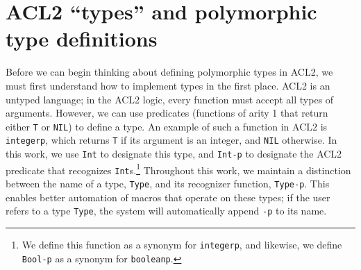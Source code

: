 \documentclass[]{eptcs}
\begin{document}
\section{ACL2 ``types'' and polymorphic type definitions}
Before we can begin thinking about defining polymorphic types in ACL2, we must first understand how to implement types in the first place. ACL2 is an untyped language; in the ACL2 logic, every function must accept all types of arguments. However, we can use predicates (functions of arity 1 that return either \verb|T| or \verb|NIL|) to define a type. An example of such a function in ACL2 is \verb|integerp|, which returns \verb|T| if its argument is an integer, and \verb|NIL| otherwise. In this work, we use \verb|Int| to designate this type, and \verb|Int-p| to designate the ACL2 predicate that recognizes \verb|Int|s.\footnote{We define this function as a synonym for \texttt{integerp}, and likewise, we define \texttt{Bool-p} as a synonym for \texttt{booleanp}.} Throughout this work, we maintain a distinction between the name of a type, \verb|Type|, and its recognizer function, \verb|Type-p|. This enables better automation of macros that operate on these types; if the user refers to a type \verb|Type|, the system will automatically append \verb|-p| to its name.
\end{document}
